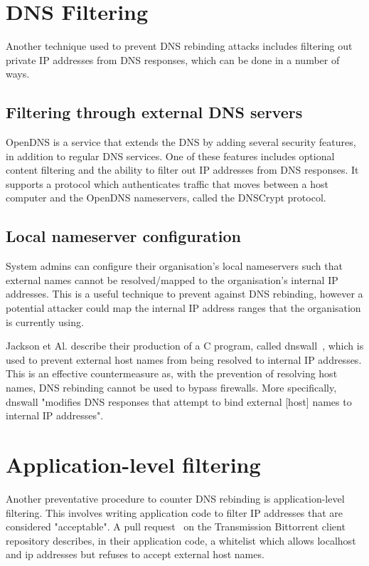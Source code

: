 \section{DNS Filtering}

Another technique used to prevent DNS rebinding attacks includes
filtering out private IP addresses from DNS responses, which can be
done in a number of ways.

\subsection{Filtering through external DNS servers}

OpenDNS is a service that extends the DNS by adding several security
features, in addition to regular DNS services. One of these features
includes optional content filtering and the ability to filter out
IP addresses from DNS responses. It supports a protocol which
authenticates traffic that moves between a host computer and the
OpenDNS nameservers, called the DNSCrypt protocol.

\subsection{Local nameserver configuration}

System admins can configure their organisation's local nameservers
such that external names cannot be resolved/mapped to the organisation's
internal IP addresses. This is a useful technique to prevent against
DNS rebinding, however a potential attacker could map the internal
IP address ranges that the organisation is currently using.

Jackson et Al. describe their production of a C program, called
dnswall~\cite{jackson2009protecting}, which is used to prevent external
host names from being resolved to internal IP addresses. This is an effective
countermeasure as, with the prevention of resolving host names,
DNS rebinding cannot be used to bypass firewalls. More specifically,
dnswall "modifies DNS responses that attempt to bind external [host] names
to internal IP addresses".

\section{Application-level filtering}

Another preventative procedure to counter DNS rebinding is application-level
filtering. This involves writing application code to filter IP addresses
that are considered "acceptable". A pull request~\cite{transmission_pr} on the
Transmission Bittorrent client repository describes, in their application code,
a whitelist which allows localhost and ip addresses but refuses to accept
external host names.
